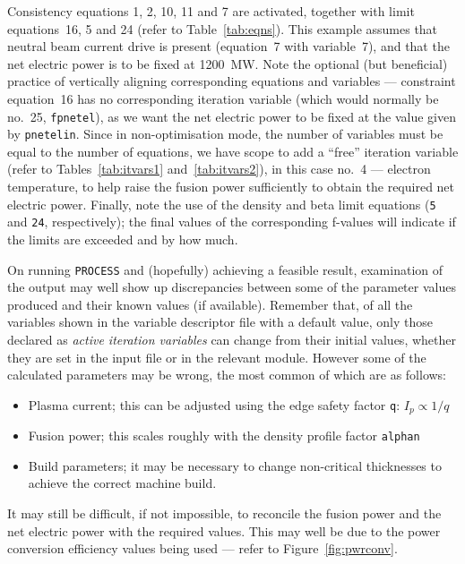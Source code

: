 \documentclass[11pt,a4paper]{report}
\newcommand{\process}{\mbox{\texttt{PROCESS}}}
\begin{document}
Consistency equations 1, 2, 10, 11 and 7 are activated, together with limit
equations~16, 5 and 24 (refer to Table~\ref{tab:eqns}). This example assumes
that neutral beam current drive is present (equation~7 with variable~7), and
that the net electric power is to be fixed at 1200~MW\@. Note the optional
(but beneficial) practice of vertically aligning corresponding equations and
variables --- constraint equation~16 has no corresponding iteration variable
(which would normally be no.\ 25, \texttt{fpnetel}), as we want the net
electric power to be fixed at the value given by \texttt{pnetelin}. Since in
non-optimisation mode, the number of variables must be equal to the number of
equations, we have scope to add a ``free'' iteration variable (refer to
Tables~\ref{tab:itvars1} and~\ref{tab:itvars2}), in this case no.\ 4 ---
electron temperature, to help raise the fusion power sufficiently to obtain
the required net electric power. Finally, note the use of the density and beta
limit equations (\texttt{5} and \texttt{24}, respectively); the final values
of the corresponding f-values will indicate if the limits are exceeded and by
how much.

On running \process\/ and (hopefully) achieving a feasible result, examination
of the output may well show up discrepancies between some of the parameter
values produced and their known values (if available). Remember that, of all
the variables shown in the variable descriptor file with a default value, only
those declared as \textit{active iteration variables}\/ can change from their
initial values, whether they are set in the input file or in the relevant
module. However some of the calculated parameters may be wrong, the most
common of which are as follows:
\begin{itemize}

\item Plasma current; this can be adjusted using the edge safety factor
  \texttt{q}: $I_p \propto 1/q$

\item Fusion power; this scales roughly with the density profile factor
  \texttt{alphan}

\item Build parameters; it may be necessary to change non-critical thicknesses
  to achieve the correct machine build.

\end{itemize}

It may still be difficult, if not impossible, to reconcile the fusion power
and the net electric power with the required values. This may well be due to
the power conversion efficiency values being used --- refer to
Figure~\ref{fig:pwrconv}.
\end{document}

